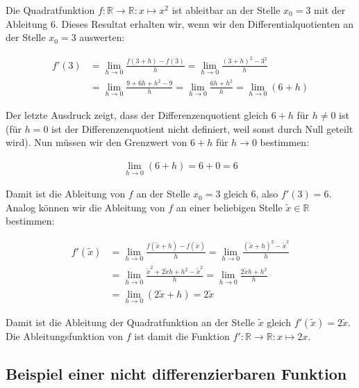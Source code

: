 \documentclass[fontsize=9pt,
               parskip=half-,
               DIV=14,
               listof=chapterentry,
               tocflat]{scrbook}
\begin{document}
\begin{example*}
Die Quadratfunktion $f:\mathbb {R} \to \mathbb {R} :x\mapsto x^{2}$ ist ableitbar an der Stelle $x_{0}=3$ mit der Ableitung $6$. Dieses Resultat erhalten wir, wenn wir den Differentialquotienten an der Stelle $x_{0}=3$ auswerten:

\begin{align*}
f'(3)&=\lim _{h\to 0}{\frac {f(3+h)-f(3)}{h}}=\lim _{h\to 0}{\frac {(3+h)^{2}-3^{2}}{h}}\\[0.3em]&=\lim _{h\to 0}{\frac {9+6h+h^{2}-9}{h}}=\lim _{h\to 0}{\frac {6h+h^{2}}{h}}=\lim _{h\to 0}{(6+h)}
\end{align*}

Der letzte Ausdruck zeigt, dass der Differenzenquotient gleich $6+h$ für $h\neq 0$ ist (für $h=0$ ist der Differenzenquotient nicht definiert, weil sonst durch Null geteilt wird). Nun müssen wir den Grenzwert von $6+h$ für $h\to 0$ bestimmen:

\begin{align*}
\lim _{h\to 0}{(6+h)}=6+0=6
\end{align*}

Damit ist die Ableitung von $f$ an der Stelle $x_{0}=3$ gleich $6$, also $f'(3)=6$. Analog können wir die Ableitung von $f$ an einer beliebigen Stelle ${\tilde {x}}\in \mathbb {R} $ bestimmen:

\begin{align*}
f'({\tilde {x}})&=\lim _{h\to 0}{\frac {f({\tilde {x}}+h)-f({\tilde {x}})}{h}}=\lim _{h\to 0}{\frac {({\tilde {x}}+h)^{2}-{\tilde {x}}^{2}}{h}}\\[0.3em]&=\lim _{h\to 0}{\frac {{\tilde {x}}^{2}+2{\tilde {x}}h+h^{2}-{\tilde {x}}^{2}}{h}}=\lim _{h\to 0}{\frac {2{\tilde {x}}h+h^{2}}{h}}\\[0.3em]&=\lim _{h\to 0}{(2{\tilde {x}}+h)}=2{\tilde {x}}
\end{align*}

Damit ist die Ableitung der Quadratfunktion an der Stelle ${\tilde {x}}$ gleich $f'({\tilde {x}})=2{\tilde {x}}$. Die Ableitungsfunktion von $f$ ist damit die Funktion $f':\mathbb {R} \to \mathbb {R} :x\mapsto 2x$.

\end{example*}

\subsection{Beispiel einer nicht differenzierbaren Funktion}
\end{document}
